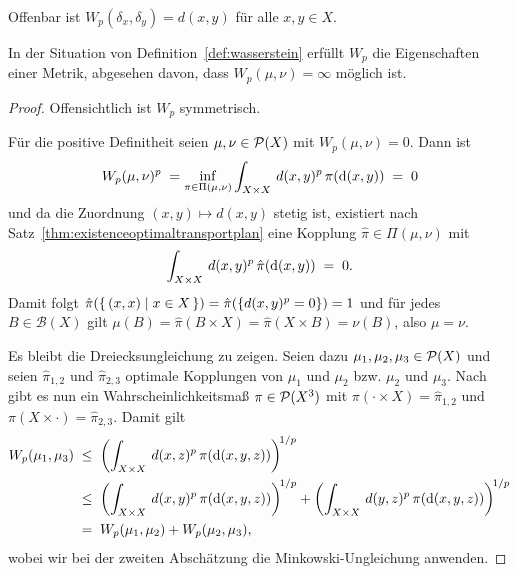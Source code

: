 \documentclass[../main/main.tex]{subfiles}
\begin{document}
	\begin{Bemerkung}
		Offenbar ist $W_p(\delta_x, \delta_y) = d(x, y)$ für alle $x, y \in X$. 
	\end{Bemerkung}

	\begin{Satz}
		\label{thm:wassersteinismetric}
		In der Situation von Definition~\ref{def:wasserstein} erfüllt $W_p$ die Eigenschaften einer Metrik, abgesehen davon, dass $W_p(\mu, \nu) = \infty$ möglich ist.
	\end{Satz}

	\begin{proof}
		Offensichtlich ist $W_p$ symmetrisch.
		
		Für die positive Definitheit seien $\mu, \nu \in \mathcal{P}(X)$ mit $W_p(\mu, \nu) = 0$. Dann ist
		\[ W_p(\mu, \nu)^p \; = \inf_{\pi \in \Pi(\mu, \nu)} \int_{X \times X} \, d(x, y)^p \, \pi(\mathrm{d}(x, y)) \; = \; 0 \]
		und da die Zuordnung $(x, y) \mapsto d(x, y)$ stetig ist, existiert nach Satz~\ref{thm:existenceoptimaltransportplan} eine Kopplung $\hat{\pi} \in \Pi(\mu, \nu)$ mit
		\[ \int_{X \times X} \, d(x, y)^p \, \hat{\pi}(\mathrm{d}(x, y)) \; = \; 0 \text{.} \]
		Damit folgt $\hat{\pi}(\left\{\, (x, x) \; \middle| \; x \in X \,\right\}) = \hat{\pi}(\left\{d(x, y)^p = 0\right\}) = 1$ und für jedes $B \in \mathcal{B}(X)$ gilt
		$\mu(B) = \hat{\pi}(B \times X) = \hat{\pi}(X \times B) = \nu(B)$, also $\mu = \nu$.
		
		Es bleibt die Dreiecksungleichung zu zeigen. Seien dazu $\mu_1, \mu_2, \mu_3 \in \mathcal{P}(X)$ und seien $\hat{\pi}_{1, 2}$ und $\hat{\pi}_{2, 3}$ optimale Kopplungen von
		$\mu_1$ und $\mu_2$ bzw. $\mu_2$ und $\mu_3$. Nach \cite[S. 23-24]{Villani.2009} gibt es nun ein Wahrscheinlichkeitsmaß $\pi \in \mathcal{P}(X^3)$ mit 
		$\pi(\cdot \times X) = \hat{\pi}_{1, 2}$ und $\pi(X \times \cdot) = \hat{\pi}_{2, 3}$. Damit gilt
		\begin{align*}
			W_p(\mu_1, \mu_3) \; &\leq \; \left(\int_{X \times X} \, d(x, z)^p \, \pi(\mathrm{d}(x, y, z))\right)^{\! 1/p} \\
			                     &\leq \; \left(\int_{X \times X} \, d(x, y)^p \, \pi(\mathrm{d}(x, y, z))\right)^{\! 1/p} + \left(\int_{X \times X} \, d(y, z)^p \, \pi(\mathrm{d}(x, y, z))\right)^{\! 1/p} \\
			                     &=    \; W_p(\mu_1, \mu_2) + W_p(\mu_2, \mu_3) \text{,}
		\end{align*}
		wobei wir bei der zweiten Abschätzung die Minkowski-Ungleichung anwenden.
	\end{proof}
\end{document}
